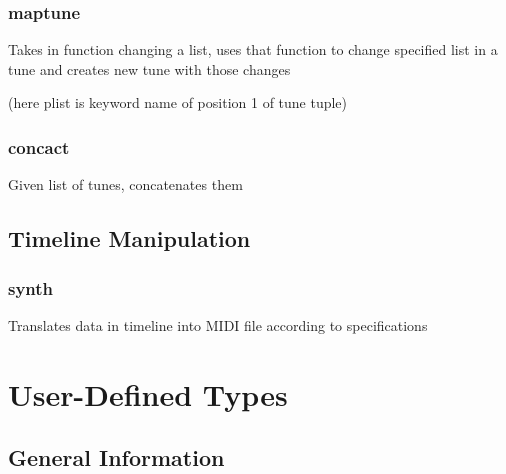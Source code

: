 \documentclass[12pt]{report}
\begin{document}
\subsection{maptune}

Takes in function changing a list, uses that function to change specified list in a tune and  creates new tune with those changes


(here plist is keyword name of position 1 of tune tuple)

\subsection{concact}
 Given list of tunes, concatenates them  





\section{Timeline Manipulation}


\subsection{synth}

Translates data in timeline into MIDI file according to specifications

\chapter{User-Defined Types}

\section{General Information}
\end{document}
